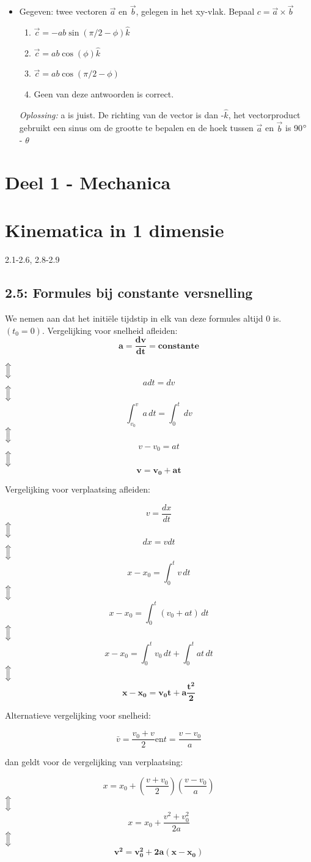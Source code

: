 \documentclass[12pt,a4paper]{article}
\newcommand{\Luda}{\Big\Updownarrow}
\begin{document}
\begin{itemize}
        \item Gegeven: twee vectoren $\vec{a}$ en $\vec{b}$, gelegen in het xy-vlak.
        Bepaal \(c = \vec{a} \times \vec{b}\)
        \begin{enumerate}
            [label=\alph*)]
            \item \(\vec{c} = - ab \sin(\pi/2 - \phi)\hat{k}\)
            \item \(\vec{c} = ab \cos(\phi)\hat{k}\)
            \item \(\vec{c} = ab \cos(\pi/2 - \phi)\)
            \item Geen van deze antwoorden is correct.
        \end{enumerate}
        \textit{Oplossing:} a is juist. De richting van de vector is dan -$\hat{k}$, het vectorproduct gebruikt een sinus om de grootte te bepalen en de hoek tussen $\vec{a}$ en $\vec{b}$ is 90$\degree$ - $\theta$
    \end{itemize}


    \section{Deel 1 - Mechanica}


    \section{Kinematica in 1 dimensie}
    2.1-2.6, 2.8-2.9

    \subsection{2.5: Formules bij constante versnelling}
    We nemen aan dat het initiële tijdstip in elk van deze formules altijd 0 is. \((t_{0} = 0)\).
    Vergelijking voor snelheid afleiden:
    \[\mathbf{a = \frac{dv}{dt} = constante}\]
    \begin{center}
	    $\Luda$ \[a dt = dv\]
	    $\Luda$ \[\int_{v_0}^{v} a \, dt = \int_{0}^{t} \,dv\]
	    $\Luda$\[v - v_0 = at\]
	    $\Luda$\[\mathbf{v = v_0 + at}\]
    \end{center}
    Vergelijking voor verplaatsing afleiden:
    \begin{center}
               \[v = \frac{dx}{dt}\]
	    $\Luda$\[dx = v dt\]
	    $\Luda$\[x - x_0 = \int_{0}^{t} v \, dt\]
	    $\Luda$\[x - x_0 = \int_{0}^{t} (v_0 + at) \, dt\]
	    $\Luda$\[x - x_0 = \int_{0}^{t} v_0 \, dt + \int_{0}^{t} at \, dt\]
	    $\Luda$\[\mathbf{x - x_0 = v_0t + a\frac{t^2}{2}}\]
    \end{center}
    Alternatieve vergelijking voor snelheid:
    \begin{center}
    	\[\bar{v} = \frac{v_0 + v}{2} \text{en} t = \frac{v - v_0}{a}\]
    \end{center}
    dan geldt voor de vergelijking van verplaatsing:
    \begin{center}
               \[x = x_0 + (\frac{v + v_0}{2})(\frac{v - v_0}{a})\]
	    $\Luda$\[x = x_0 + \frac{v^2 + v_0^2}{2a}\]
	    $\Luda$\[\mathbf{v^2 = v_0^2 + 2a(x - x_0)}\]
    \end{center}
\end{document}
